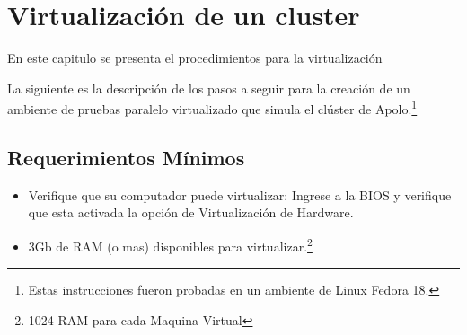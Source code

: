 \section{Virtualización de un cluster}



En este capitulo se presenta el procedimientos para la virtualización 



La siguiente es la descripción de los pasos a seguir para la creación de un ambiente de pruebas paralelo virtualizado que simula el clúster de Apolo.\footnote{Estas instrucciones fueron probadas en un ambiente de Linux Fedora 18.}

\subsection{Requerimientos Mínimos}

\begin{itemize}
	\item Verifique que su computador puede virtualizar: Ingrese a la BIOS y verifique que esta activada la opción de Virtualización de Hardware. 

	\item 3Gb de RAM (o mas)  disponibles para virtualizar.\footnote{1024 RAM para cada Maquina Virtual}
\end{itemize}

